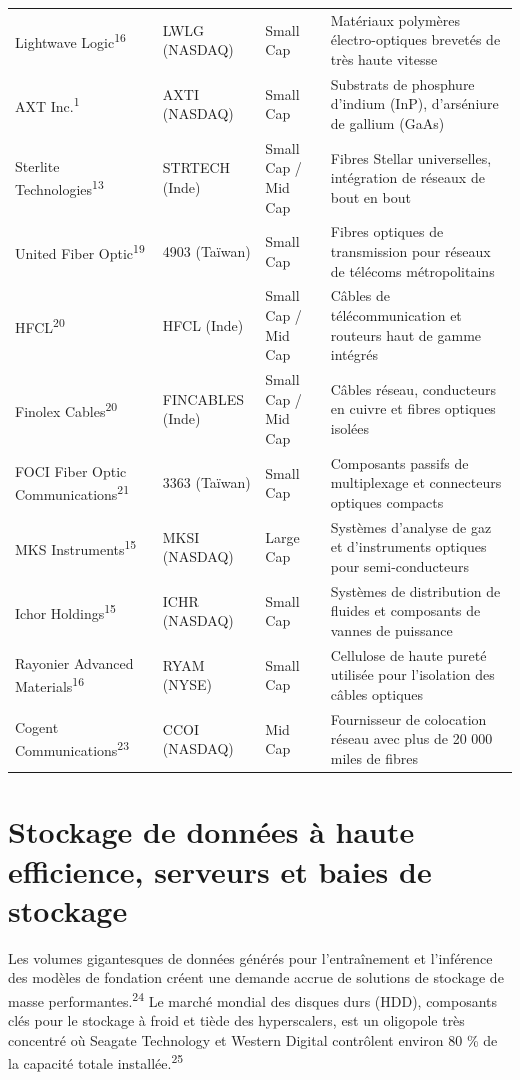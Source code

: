 \documentclass[11pt,a4paper]{article}
\begin{document}
\begin{longtable}{p{3cm} p{3.5cm} p{3cm} p{5cm}}
Lightwave Logic\textsuperscript{16} & LWLG (NASDAQ) & Small Cap & Matériaux polymères électro-optiques brevetés de très haute vitesse \\
AXT Inc.\textsuperscript{1} & AXTI (NASDAQ) & Small Cap & Substrats de phosphure d'indium (InP), d'arséniure de gallium (GaAs) \\
Sterlite Technologies\textsuperscript{13} & STRTECH (Inde) & Small Cap / Mid Cap & Fibres Stellar universelles, intégration de réseaux de bout en bout \\
United Fiber Optic\textsuperscript{19} & 4903 (Taïwan) & Small Cap & Fibres optiques de transmission pour réseaux de télécoms métropolitains \\
HFCL\textsuperscript{20} & HFCL (Inde) & Small Cap / Mid Cap & Câbles de télécommunication et routeurs haut de gamme intégrés \\
Finolex Cables\textsuperscript{20} & FINCABLES (Inde) & Small Cap / Mid Cap & Câbles réseau, conducteurs en cuivre et fibres optiques isolées \\
FOCI Fiber Optic Communications\textsuperscript{21} & 3363 (Taïwan) & Small Cap & Composants passifs de multiplexage et connecteurs optiques compacts \\
MKS Instruments\textsuperscript{15} & MKSI (NASDAQ) & Large Cap & Systèmes d'analyse de gaz et d'instruments optiques pour semi-conducteurs \\
Ichor Holdings\textsuperscript{15} & ICHR (NASDAQ) & Small Cap & Systèmes de distribution de fluides et composants de vannes de puissance \\
Rayonier Advanced Materials\textsuperscript{16} & RYAM (NYSE) & Small Cap & Cellulose de haute pureté utilisée pour l'isolation des câbles optiques \\
Cogent Communications\textsuperscript{23} & CCOI (NASDAQ) & Mid Cap & Fournisseur de colocation réseau avec plus de 20 000 miles de fibres \\
\bottomrule
\end{longtable}

\section*{Stockage de données à haute efficience, serveurs et baies de stockage}

Les volumes gigantesques de données générés pour l'entraînement et l'inférence des modèles de fondation créent une demande accrue de solutions de stockage de masse performantes.\textsuperscript{24} Le marché mondial des disques durs (HDD), composants clés pour le stockage à froid et tiède des hyperscalers, est un oligopole très concentré où Seagate Technology et Western Digital contrôlent environ 80 \% de la capacité totale installée.\textsuperscript{25}
\end{document}

